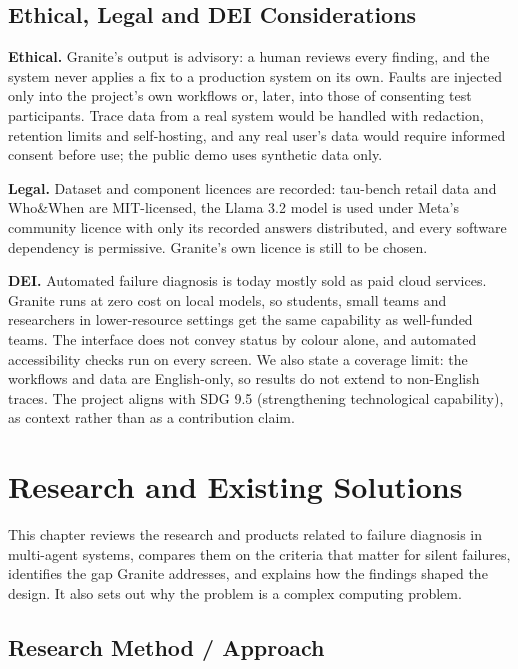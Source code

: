 \documentclass{fast-nuces-bs}
\begin{document}
\section{Ethical, Legal and DEI Considerations}

\textbf{Ethical.} Granite's output is advisory: a human reviews every finding, and the system never applies a fix to a production system on its own. Faults are injected only into the project's own workflows or, later, into those of consenting test participants. Trace data from a real system would be handled with redaction, retention limits and self-hosting, and any real user's data would require informed consent before use; the public demo uses synthetic data only.

\textbf{Legal.} Dataset and component licences are recorded: tau-bench retail data and Who\&When are MIT-licensed, the Llama 3.2 model is used under Meta's community licence with only its recorded answers distributed, and every software dependency is permissive. Granite's own licence is still to be chosen.

\textbf{DEI.} Automated failure diagnosis is today mostly sold as paid cloud services. Granite runs at zero cost on local models, so students, small teams and researchers in lower-resource settings get the same capability as well-funded teams. The interface does not convey status by colour alone, and automated accessibility checks run on every screen. We also state a coverage limit: the workflows and data are English-only, so results do not extend to non-English traces. The project aligns with SDG 9.5 (strengthening technological capability), as context rather than as a contribution claim.

\chapter{Research and Existing Solutions}

This chapter reviews the research and products related to failure diagnosis in multi-agent systems, compares them on the criteria that matter for silent failures, identifies the gap Granite addresses, and explains how the findings shaped the design. It also sets out why the problem is a complex computing problem.

\section{Research Method / Approach}
\end{document}
